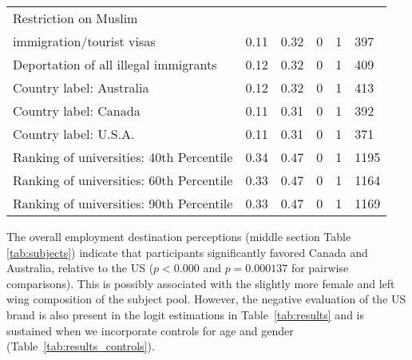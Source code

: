 \documentclass[12pt]{article}
\begin{document}
\begin{appendices}
\begin{table}[!htbp]
\begin{center}
\begin{tabular}{llllll}
  Restriction on Muslim   & &  & &  &  \\
  immigration/tourist visas & 0.11 & 0.32 & 0 & 1 & 397 \\ 
  Deportation of all illegal immigrants & 0.12 & 0.32 & 0 & 1 & 409 \\ 
  Country label: Australia & 0.12 & 0.32 & 0 & 1 & 413 \\ 
  Country label: Canada & 0.11 & 0.31 & 0 & 1 & 392 \\ 
  Country label: U.S.A. & 0.11 & 0.31 & 0 & 1 & 371 \\ 
  Ranking of universities: 40th Percentile & 0.34 & 0.47 & 0 & 1 & 1195 \\ 
  Ranking of universities: 60th Percentile & 0.33 & 0.47 & 0 & 1 & 1164 \\ 
  Ranking of universities: 90th Percentile & 0.33 & 0.47 & 0 & 1 & 1169 \\ 
   \hline
\end{tabular}
\end{center}
\end{table}


The overall employment destination perceptions (middle section Table \ref{tab:subjects}) indicate that participants significantly favored Canada and Australia, relative to the US ($p<0.000$ and $p = 0.000137$ for pairwise comparisons). This is possibly associated with the slightly more female and left wing composition of the subject pool. However, the negative evaluation of the US brand is also present in the logit estimations in Table~\ref{tab:results} and is sustained when we incorporate controls for age and gender (Table~\ref{tab:results_controls}).


\end{appendices}
\end{document}
